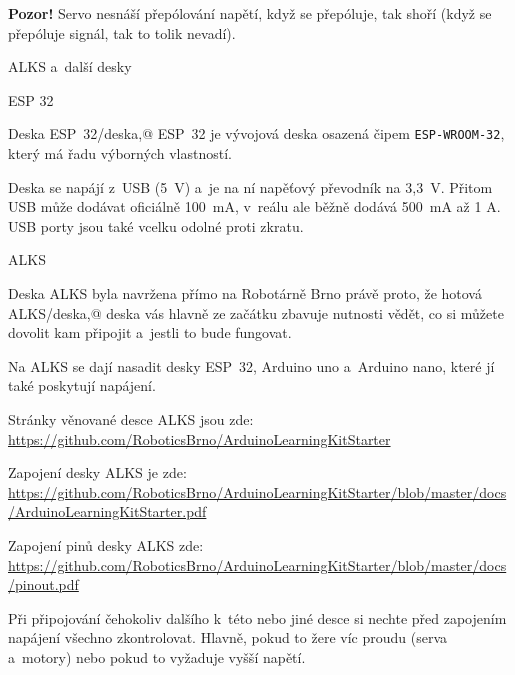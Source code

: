 {\bf Pozor!} Servo nesnáší přepólování napětí, když se přepóluje, tak shoří (když se přepóluje signál, tak to tolik nevadí).

\sec ALKS a~další desky 

\secc ESP 32  

Deska \ii ESP~32/deska,@ ESP~32 je vývojová deska osazená čipem {\tt ESP-WROOM-32}, který má řadu výborných vlastností.

Deska se napájí z~\iid USB (5~V) a~je na ní napěťový převodník na 3,3~V. Přitom USB může dodávat oficiálně 100~mA, v~reálu ale běžně dodává 500~mA až 1 A. USB porty jsou také vcelku odolné proti zkratu.   

\secc ALKS

Deska ALKS byla navržena přímo na Robotárně Brno právě proto, že 
hotová \ii ALKS/deska,@ deska   vás hlavně ze začátku zbavuje nutnosti vědět, co si můžete dovolit kam připojit a~jestli to bude fungovat. 

Na ALKS se dají nasadit desky ESP~32, Arduino uno  a~Arduino nano, které jí také poskytují napájení.  

Stránky  věnované desce ALKS jsou zde: \hfil \break  \url{https://github.com/RoboticsBrno/ArduinoLearningKitStarter}  

Zapojení \emergencystretch=2cm desky ALKS je zde: \url{https://github.com/RoboticsBrno/ArduinoLearningKitStarter/blob/master/docs/ArduinoLearningKitStarter.pdf}

Zapojení pinů desky ALKS zde: \url{https://github.com/RoboticsBrno/ArduinoLearningKitStarter/blob/master/docs/pinout.pdf}

Při připojování čehokoliv dalšího k~této nebo jiné desce si nechte před zapojením napájení všechno zkontrolovat. Hlavně, pokud to žere víc proudu (serva a~motory) nebo pokud to vyžaduje vyšší napětí. 


